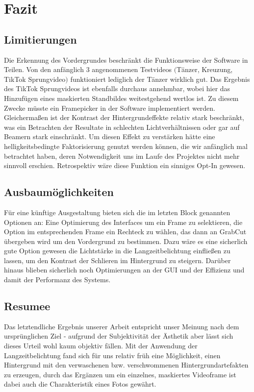 \documentclass[12pt]{scrartcl}
\begin{document}



\section{Fazit}
\subsection{Limitierungen}
Die Erkennung des Vordergrundes beschr\"ankt die Funktionsweise der Software in Teilen. Von den anf\"anglich 3 angenommenen Testvideos
$ ( $T\"anzer, Kreuzung, TikTok Sprungvideo$ ) $ funktioniert lediglich der T\"anzer wirklich gut. Das Ergebnis des TikTok Sprungvideos ist
ebenfalls durchaus annehmbar, wobei hier das Hinzuf\"ugen eines maskierten Standbildes weitestgehend wertlos ist. Zu diesem Zwecke m\"usste ein Framepicker in der Software implementiert werden. Gleicherma{\ss}en ist der Kontrast der Hintergrundeffekte relativ stark beschr\"ankt, was ein Betrachten der Resultate in schlechten Lichtverh\"altnissen oder gar auf Beamern stark einschr\"ankt. Um diesen Effekt zu verst\"arken h\"atte eine helligkeitsbedingte Faktorisierung genutzt werden k\"onnen, die wir anf\"anglich mal betrachtet haben, deren Notwendigkeit uns im Laufe des Projektes nicht mehr sinnvoll erschien. Retrospektiv w\"are diese Funktion ein sinniges Opt-In gewesen.
\subsection{Ausbaum\"oglichkeiten}
F\"ur eine k\"unftige Ausgestaltung bieten sich die im letzten Block genannten Optionen an: Eine Optimierung des Interfaces um ein Frame zu selektieren, die Option im entsprechenden Frame ein Rechteck zu w\"ahlen, das dann an GrabCut \"ubergeben wird um den Vordergrund zu bestimmen. Dazu w\"are es eine sicherlich gute Option gewesen die Lichtst\"arke in die Langzeitbelichtung einflie{\ss}en zu lassen, um den Kontrast der Schlieren im Hintergrund zu steigern. Darüber hinaus blieben sicherlich noch Optimierungen an der GUI und der Effizienz und damit der Performanz des Systems.
\subsection{Resumee}
Das letztendliche Ergebnis unserer Arbeit entspricht unser Meinung nach dem urspr\"unglichen Ziel - aufgrund der Subjektivit\"at der
\"Asthetik aber l\"asst sich dieses Urteil wohl kaum objektiv f\"allen. Mit der Anwendung der Langzeitbelichtung fand sich f\"ur uns relativ
fr\"uh eine M\"oglichkeit, einen Hintergrund mit den verwaschenen bzw. verschwommenen Hintergrundartefakten zu erzeugen, durch das Erg\"anzen um ein einzelnes, maskiertes Videoframe ist dabei auch die Charakteristik eines Fotos gewährt.
\end{document}
